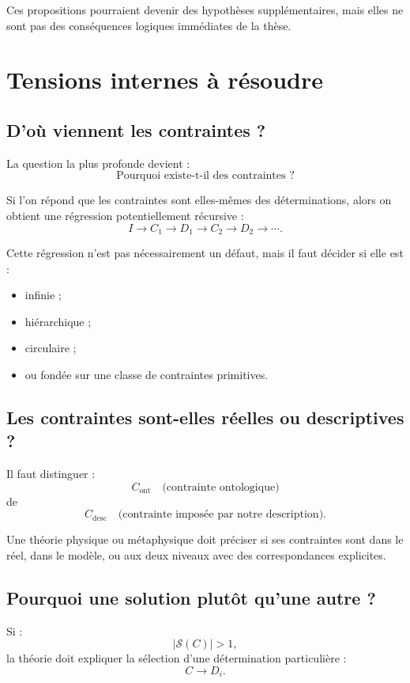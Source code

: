 \documentclass[11pt,a4paper]{article}
\begin{document}
Ces propositions pourraient devenir des hypothèses supplémentaires, mais elles
ne sont pas des conséquences logiques immédiates de la thèse.

\section{Tensions internes à résoudre}

\subsection{D'où viennent les contraintes ?}

La question la plus profonde devient :
\[
\boxed{\text{Pourquoi existe-t-il des contraintes ?}}
\]

Si l'on répond que les contraintes sont elles-mêmes des déterminations,
alors on obtient une régression potentiellement récursive :
\[
I\to C_1\to D_1\to C_2\to D_2\to\cdots.
\]

Cette régression n'est pas nécessairement un défaut, mais il faut décider si
elle est :
\begin{itemize}
\item infinie ;
\item hiérarchique ;
\item circulaire ;
\item ou fondée sur une classe de contraintes primitives.
\end{itemize}

\subsection{Les contraintes sont-elles réelles ou descriptives ?}

Il faut distinguer :
\[
C_{\mathrm{ont}}\quad\text{(contrainte ontologique)}
\]
de
\[
C_{\mathrm{desc}}\quad\text{(contrainte imposée par notre description)}.
\]

Une théorie physique ou métaphysique doit préciser si ses contraintes sont
dans le réel, dans le modèle, ou aux deux niveaux avec des correspondances
explicites.

\subsection{Pourquoi une solution plutôt qu'une autre ?}

Si :
\[
|\mathcal S(C)|>1,
\]
la théorie doit expliquer la sélection d'une détermination particulière :
\[
C\to D_i.
\]
\end{document}
